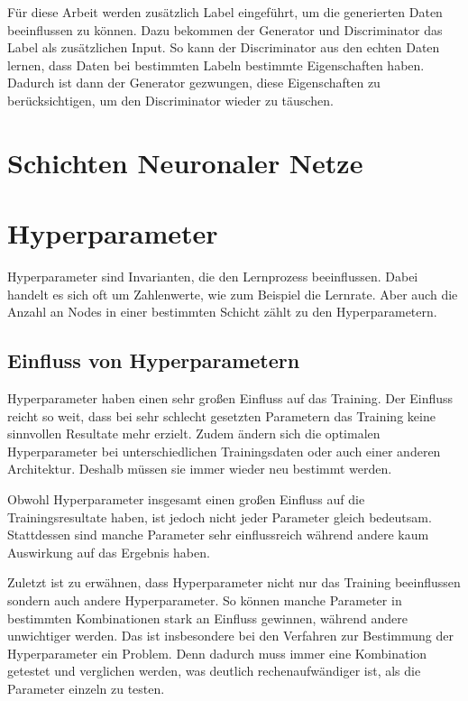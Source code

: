 Für diese Arbeit werden zusätzlich Label eingeführt, um die generierten Daten beeinflussen zu können.
Dazu bekommen der Generator und Discriminator das Label als zusätzlichen Input.
So kann der Discriminator aus den echten Daten lernen, dass Daten bei bestimmten Labeln bestimmte Eigenschaften haben.
Dadurch ist dann der Generator gezwungen, diese Eigenschaften zu berücksichtigen, um den Discriminator wieder zu täuschen.
\newline


\section{Schichten Neuronaler Netze}

\section{Hyperparameter}

Hyperparameter sind Invarianten, die den Lernprozess beeinflussen.
Dabei handelt es sich oft um Zahlenwerte, wie zum Beispiel die Lernrate.
Aber auch die Anzahl an Nodes in einer bestimmten Schicht zählt zu den Hyperparametern.
\newline

\subsection{Einfluss von Hyperparametern}
Hyperparameter haben einen sehr großen Einfluss auf das Training.
Der Einfluss reicht so weit, dass bei sehr schlecht gesetzten Parametern das Training keine sinnvollen Resultate mehr erzielt.
Zudem ändern sich die optimalen Hyperparameter bei unterschiedlichen Trainingsdaten oder auch einer anderen Architektur.
Deshalb müssen sie immer wieder neu bestimmt werden.

Obwohl Hyperparameter insgesamt einen großen Einfluss auf die Trainingsresultate haben, ist jedoch nicht jeder Parameter gleich bedeutsam.
Stattdessen sind manche Parameter sehr einflussreich während andere kaum Auswirkung auf das Ergebnis haben.

Zuletzt ist zu erwähnen, dass Hyperparameter nicht nur das Training beeinflussen sondern auch andere Hyperparameter.
So können manche Parameter in bestimmten Kombinationen stark an Einfluss gewinnen, während andere unwichtiger werden.
Das ist insbesondere bei den Verfahren zur Bestimmung der Hyperparameter ein Problem.
Denn dadurch muss immer eine Kombination getestet und verglichen werden, was deutlich rechenaufwändiger ist, als die Parameter einzeln zu testen.

